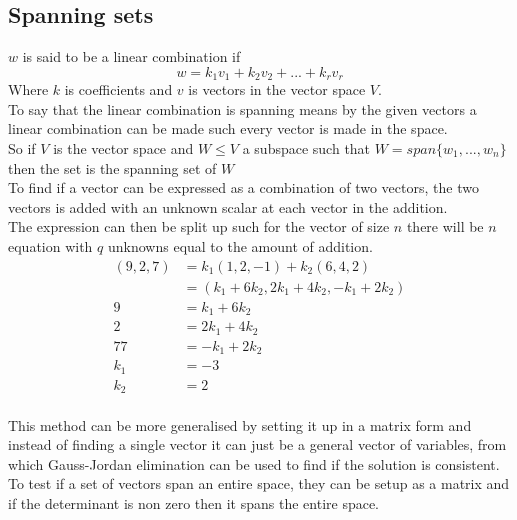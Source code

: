 \documentclass[12pt, a4paper]{article}
\begin{document}
		\subsection{Spanning sets}
			$w$ is said to be a linear combination if 
			$$w=k_1v_1+k_2v_2+...+k_rv_r$$
			Where $k$ is coefficients and $v$ is vectors in the vector space $V$.\\
			To say that the linear combination is spanning means by the given vectors a linear combination can be made such every vector is made in the space.\\
			So if $V$ is the vector space and $W\leq V$ a subspace such that $W=span\{w_1,...,w_n\}$ then the set is the spanning set of $W$\\
			To find if a vector can be expressed as a combination of two vectors, the two vectors is added with an unknown scalar at each vector in the addition.\\
			The expression can then be split up such for the vector of size $n$ there will be $n$ equation with $q$ unknowns equal to the amount of addition.\\
			\begin{align*}
				(9,2,7)&=k_1(1,2,-1)+k_2(6,4,2)\\
				&=(k_1+6k_2,2k_1+4k_2,-k_1+2k_2)\\[3mm]
				9&=k_1+6k_2\\
				2&=2k_1+4k_2\\
				77&=-k_1+2k_2\\[3mm]
				k_1&=-3\\
				k_2&=2
			\end{align*}\\
			This method can be more generalised by setting it up in a matrix form and instead of finding a single vector it can just be a general vector of variables, from which Gauss-Jordan elimination can be used to find if the solution is consistent.
			To test if a set of vectors span an entire space, they can be setup as a matrix and if the determinant is non zero then it spans the entire space.
\end{document}
